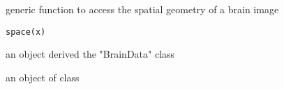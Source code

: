 \begin{Description}\relax
generic function to access the spatial geometry of a brain image
\end{Description}
\begin{Usage}
\begin{verbatim}
space(x)
\end{verbatim}
\end{Usage}
\begin{Arguments}
\begin{ldescription}
\item[\code{x}] an object derived the "BrainData" class 
\end{ldescription}
\end{Arguments}
\begin{Value}
an object of class 
\end{Value}

